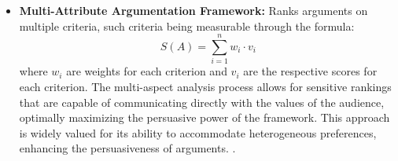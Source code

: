 \documentclass[conference]{IEEEtran}
\begin{document}
\begin{itemize}
    \item \textbf{Multi-Attribute Argumentation Framework:} 
    Ranks arguments on multiple criteria, such criteria being measurable through the formula: 
    \[
    S(A) = \sum_{i=1}^{n} w_i \cdot v_i
    \]
    where \( w_i \) are weights for each criterion and \( v_i \) are the respective scores for each criterion. The multi-aspect analysis process allows for sensitive rankings that are capable of communicating directly with the values of the audience, optimally maximizing the persuasive power of the framework. This approach is widely valued for its ability to accommodate heterogeneous preferences, enhancing the persuasiveness of arguments. \cite{engelmann2022argumentation}.
    
\end{itemize}
\end{document}
